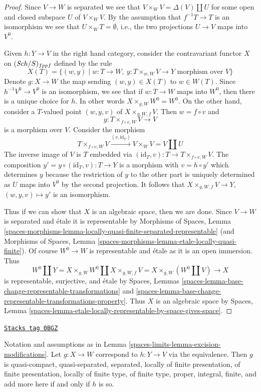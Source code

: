 \begin{proof}
Since $V \to W$ is separated we see that
$V \times_W V = \Delta(V) \amalg U$ for some open and closed subspace
$U$ of $V \times_W V$. By the assumption that $f^{-1}T \to T$ is an
isomorphism we see that $U \times_W T = \emptyset$, i.e., the two
projections $U \to V$ maps into $V^0$.

\medskip\noindent
Given $h : Y \to V$ in the right hand category, consider the
contravariant functor $X$ on $(\mathit{Sch}/S)_{fppf}$ defined by the rule
$$
X(T) = \{(w, y) \mid
w :  T \to W,\ y : T \times_{w, W} V \to Y\text{ morphism over }V\}
$$
Denote $g : X \to W$ the map sending $(w, y) \in X(T)$ to $w \in W(T)$.
Since $h^{-1}V^0 \to V^0$ is an isomorphism, we see that if
$w : T \to W$ maps into $W^0$, then there is a unique choice for $h$.
In other words $X \times_{g, W} W^0 = W^0$. On the other hand, consider
a $T$-valued point $(w, y, v)$ of $X \times_{g, W, f} V$.
Then $w = f \circ v$ and
$$
y : T \times_{f \circ v, W} V \longrightarrow V
$$
is a morphism over $V$. Consider the morphism
$$
T \times_{f \circ v, W} V \xrightarrow{(v, \text{id}_V)}
V \times_W V = V \amalg U
$$
The inverse image of $V$ is $T$ embedded via
$(\text{id}_T, v) : T \to T \times_{f \circ v, W} V$.
The composition $y' = y \circ (\text{id}_T, v) : T \to Y$
is a morphism with $v = h \circ y'$ which determines $y$ because the
restriction of $y$ to the other part is uniquely determined as
$U$ maps into $V^0$ by the second projection. It follows that
$X \times_{g, W, f} V \to Y$, $(w, y, v) \mapsto y'$ is an isomorphism.

\medskip\noindent
Thus if we can show that $X$ is an algebraic space, then we are done.
Since $V \to W$ is separated and \'etale it is representable by
Morphisms of Spaces, Lemma
\ref{spaces-morphisms-lemma-locally-quasi-finite-separated-representable}
(and Morphisms of Spaces, Lemma
\ref{spaces-morphisms-lemma-etale-locally-quasi-finite}).
Of course $W^0 \to W$ is representable and \'etale as it is an
open immersion. Thus
$$
W^0 \amalg Y = X \times_{g, W} W^0 \amalg X \times_{g, W, f} V
= X \times_{g, W} (W^0 \amalg V) \longrightarrow X
$$
is representable, surjective, and \'etale by Spaces, Lemmas
\ref{spaces-lemma-base-change-representable-transformations} and
\ref{spaces-lemma-base-change-representable-transformations-property}.
Thus $X$ is an algebraic
space by Spaces, Lemma
\ref{spaces-lemma-etale-locally-representable-by-space-gives-space}.
\end{proof}

\begin{lemma}
\label{spaces-limits-lemma-excision-modifications-properties}
\href{https://stacks.math.columbia.edu/tag/0BGZ}{\texttt{Stacks tag 0BGZ}}

Notation and assumptions as in Lemma \ref{spaces-limits-lemma-excision-modifications}.
Let $g : X \to W$ correspond to $h : Y \to V$ via the equivalence.
Then $g$ is quasi-compact, quasi-separated, separated, locally of finite
presentation, of finite presentation, locally of finite type, of finite type,
proper, integral, finite, and add more here if and only if
$h$ is so.
\end{lemma}

